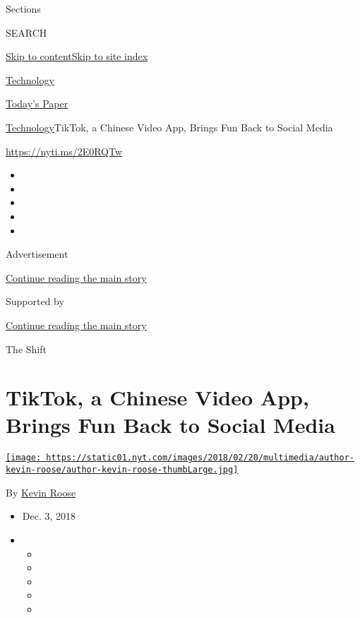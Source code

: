 Sections

SEARCH

\protect\hyperlink{site-content}{Skip to
content}\protect\hyperlink{site-index}{Skip to site index}

\href{https://www.nytimes.com/section/technology}{Technology}

\href{https://myaccount.nytimes.com/auth/login?response_type=cookie\&client_id=vi}{}

\href{https://www.nytimes.com/section/todayspaper}{Today's Paper}

\href{/section/technology}{Technology}\textbar{}TikTok, a Chinese Video
App, Brings Fun Back to Social Media

\url{https://nyti.ms/2E0RQTw}

\begin{itemize}
\item
\item
\item
\item
\item
\end{itemize}

Advertisement

\protect\hyperlink{after-top}{Continue reading the main story}

Supported by

\protect\hyperlink{after-sponsor}{Continue reading the main story}

The Shift

\hypertarget{tiktok-a-chinese-video-app-brings-fun-back-to-social-media}{%
\section{TikTok, a Chinese Video App, Brings Fun Back to Social
Media}\label{tiktok-a-chinese-video-app-brings-fun-back-to-social-media}}

\href{https://www.nytimes.com/by/kevin-roose}{\texttt{[image: https://static01.nyt.com/images/2018/02/20/multimedia/author-kevin-roose/author-kevin-roose-thumbLarge.jpg]}}

By \href{https://www.nytimes.com/by/kevin-roose}{Kevin Roose}

\begin{itemize}
\item
  Dec. 3, 2018
\item
  \begin{itemize}
  \item
  \item
  \item
  \item
  \item
  \end{itemize}
\end{itemize}

